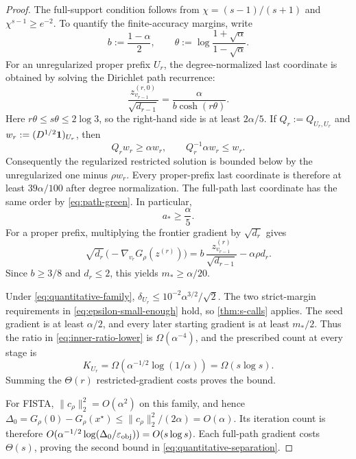 \documentclass[11pt]{article}
\begin{document}
\begin{proof}
The full-support condition follows from
$\chi=(s-1)/(s+1)$ and
$\chi^{s-1}\geq e^{-2}$.  To quantify the finite-accuracy margins, write
\[
 b:=\frac{1-\alpha}{2},
 \qquad
 \theta:=\log\frac{1+\sqrt\alpha}{1-\sqrt\alpha}.
\]
For an unregularized proper prefix $U_r$, the degree-normalized last
coordinate is obtained by solving the Dirichlet path recurrence:
\begin{equation}
 \frac{z_{v_{r-1}}^{(r,0)}}{\sqrt{d_{r-1}}}
 =\frac{\alpha}{b\cosh(r\theta)}.
 \label{eq:prefix-green-last}
\end{equation}
Here $r\theta\leq s\theta\leq2\log3$, so the right-hand side is at least
$2\alpha/5$.  If $Q_r:=Q_{U_r,U_r}$ and
$w_r:=(D^{1/2}\mathbf{1})_{U_r}$, then
\[
 Q_rw_r\geq\alpha w_r,
 \qquad
 Q_r^{-1}\alpha w_r\leq w_r.
\]
Consequently the regularized restricted solution is bounded below by the
unregularized one minus $\rho w_r$.  Every proper-prefix last coordinate is
therefore at least $39\alpha/100$ after degree normalization.  The full-path
last coordinate has the same order by \cref{eq:path-green}.  In particular,
\[
 a_*\geq\frac{\alpha}{5}.
\]
For a proper prefix, multiplying the frontier gradient by
$\sqrt{d_r}$ gives
\[
 \sqrt{d_r}\,
 \bigl(-\nabla_{v_r}G_\rho(z^{(r)})\bigr)
 =b\,\frac{z_{v_{r-1}}^{(r)}}{\sqrt{d_{r-1}}}
  -\alpha\rho d_r.
\]
Since $b\geq3/8$ and $d_r\leq2$, this yields
$m_*\geq\alpha/20$.

Under \cref{eq:quantitative-family},
$\delta_{U_r}\leq10^{-2}\alpha^{3/2}/\sqrt2$.  The two strict-margin
requirements in \cref{eq:epsilon-small-enough} hold, so
\cref{thm:s-calls} applies.  The seed gradient is at least $\alpha/2$, and
every later starting gradient is at least $m_*/2$.  Thus the ratio in
\cref{eq:inner-ratio-lower} is $\Omega(\alpha^{-4})$, and the prescribed count
at every stage is
\[
 K_{U_r}=\Omega\!\left(
   \alpha^{-1/2}\log(1/\alpha)
 \right)=\Omega(s\log s).
\]
Summing the $\Theta(r)$ restricted-gradient costs proves the \ASPR{} bound.

For FISTA, $\|c_\rho\|_2^2=O(\alpha^2)$ on this family, and hence
$\Delta_0=G_\rho(0)-G_\rho(x^\star)\leq
\|c_\rho\|_2^2/(2\alpha)=O(\alpha)$.  Its iteration count is therefore
$O(\alpha^{-1/2}\log(\Delta_0/\varepsilon_{\rm obj}))
=O(s\log s)$.  Each full-path gradient costs $\Theta(s)$, proving the second
bound in \cref{eq:quantitative-separation}.
\end{proof}
\end{document}
